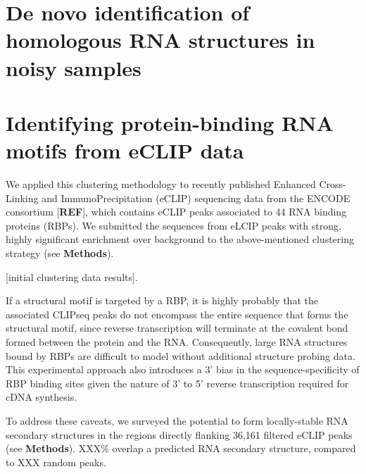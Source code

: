 \documentclass[a4paper,11pt]{article}
\begin{document}
\section{ De novo identification of homologous RNA structures in noisy samples }

\section{ Identifying protein-binding RNA motifs from eCLIP data }
We applied this clustering methodology to recently published Enhanced Cross-Linking 
and ImmunoPrecipitation (eCLIP) sequencing data from the ENCODE consortium [\textbf{REF}], 
which contains eCLIP peaks associated to 44 RNA binding proteins (RBPs). We submitted the
sequences from eLCIP peaks with strong, highly significant enrichment over background 
to the above-mentioned clustering strategy (see \textbf{Methods}). 

[initial clustering data results]. 

If a structural motif is targeted by a RBP, it is highly probably that the associated CLIPseq peaks 
do not encompass the entire sequence that forms the structural motif, since 
reverse transcription will terminate at the covalent bond formed between the 
protein and the RNA. Consequently, large RNA structures bound by RBPs are 
difficult to model without additional structure probing data. This experimental 
approach also introduces a 3' bias in the sequence-specificity of RBP binding sites 
given the nature of 3' to 5' reverse transcription required for cDNA synthesis.

To address these caveats, we surveyed the potential to form locally-stable
RNA secondary structures in the regions directly flanking 36,161 filtered eCLIP 
peaks (see \textbf{Methods}). XXX\% overlap a predicted RNA secondary structure, 
compared to XXX random peaks. 
\end{document}
